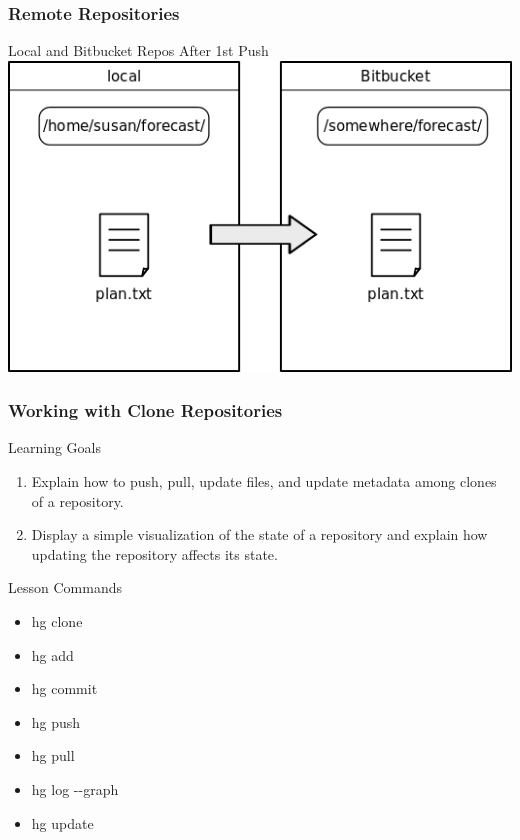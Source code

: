 \documentclass{beamer}
\renewcommand{\dh}{{-}{-}}
\begin{document}
\begin{frame}
  \frametitle{Remote Repositories}
  \begin{block}{Local and Bitbucket Repos After 1st Push}
    \includegraphics[scale=0.55]{fig/bitbucket-repo-after-first-push.png}
  \end{block}
\end{frame}




\begin{frame}[label=clones]
  \frametitle{Working with Clone Repositories}
  \begin{block}{Learning Goals}
    \begin{enumerate}
      \item Explain how to push, pull, update files, and update metadata among clones of a repository.
      \item Display a simple visualization of the state of a repository and explain how updating the repository affects its state.
    \end{enumerate}
  \end{block}
  \begin{block}{Lesson Commands}
    \begin{itemize}
      \item hg clone
      \item hg add
      \item hg commit
      \item hg push
      \item hg pull
      \item hg log \dh graph
      \item hg update
    \end{itemize}
  \end{block}
\end{frame}
\end{document}
